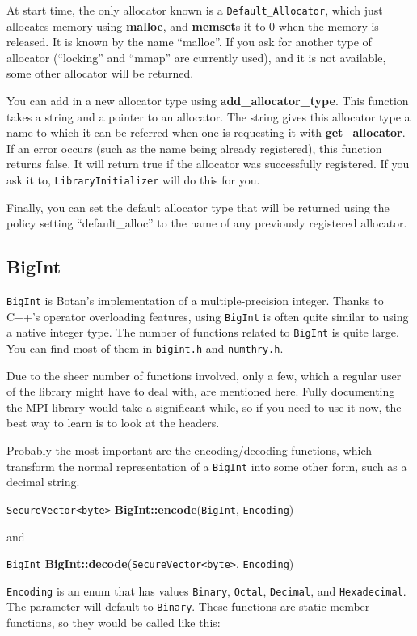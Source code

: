 \documentclass{article}
\newcommand{\filename}[1]{\texttt{#1}}
\newcommand{\function}[1]{\textbf{#1}}
\newcommand{\type}[1]{\texttt{#1}}
\begin{document}
At start time, the only allocator known is a \type{Default\_Allocator}, which
just allocates memory using \function{malloc}, and \function{memset}s it to 0
when the memory is released. It is known by the name ``malloc''. If you ask for
another type of allocator (``locking'' and ``mmap'' are currently used), and it
is not available, some other allocator will be returned.

You can add in a new allocator type using \function{add\_allocator\_type}. This
function takes a string and a pointer to an allocator. The string gives this
allocator type a name to which it can be referred when one is requesting it
with \function{get\_allocator}. If an error occurs (such as the name being
already registered), this function returns false. It will return true if the
allocator was successfully registered. If you ask it to,
\type{LibraryInitializer} will do this for you.

Finally, you can set the default allocator type that will be returned using
the policy setting ``default\_alloc'' to the name of any previously registered
allocator.

\subsection{BigInt}

\type{BigInt} is Botan's implementation of a multiple-precision
integer. Thanks to C++'s operator overloading features, using \type{BigInt} is
often quite similar to using a native integer type. The number of functions
related to \type{BigInt} is quite large. You can find most of them in
\filename{bigint.h} and \filename{numthry.h}.

Due to the sheer number of functions involved, only a few, which a regular user
of the library might have to deal with, are mentioned here. Fully documenting
the MPI library would take a significant while, so if you need to use it now,
the best way to learn is to look at the headers.

Probably the most important are the encoding/decoding functions, which
transform the normal representation of a \type{BigInt} into some other form,
such as a decimal string.

\type{SecureVector<byte>} \function{BigInt::encode}(\type{BigInt},
\type{Encoding})

\noindent
and

\type{BigInt} \function{BigInt::decode}(\type{SecureVector<byte>},
\type{Encoding})

\type{Encoding} is an enum that has values \type{Binary}, \type{Octal},
\type{Decimal}, and \type{Hexadecimal}. The parameter will default to
\type{Binary}. These functions are static member functions, so they would be
called like this:
\end{document}
